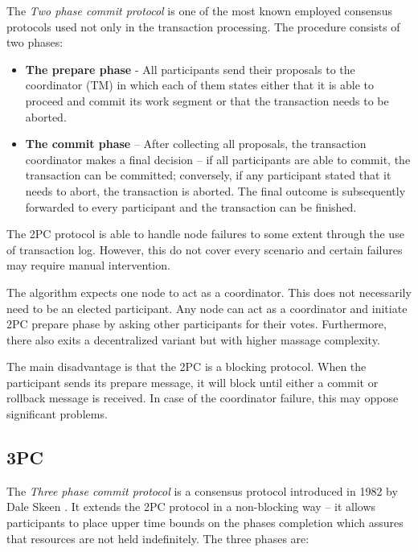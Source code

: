 \documentclass[oneside,
  digital, %
  table,   %
  nolof,     %
  nolot,     %
]{fithesis3}
\begin{document}
The \textit{Two phase commit protocol} is one of the most known employed consensus protocols used not only in the transaction processing. The procedure consists of two phases:

\begin{itemize}
    \item \textbf{The prepare phase} - All participants send their proposals to the coordinator (TM) in which each of them states either that it is able to proceed and commit its work segment or that the transaction needs to be aborted.
    
    \item \textbf{The commit phase} -- After collecting all proposals, the transaction coordinator makes a final decision -- if all participants are able to commit, the transaction can be committed; conversely, if any participant stated that it needs to abort, the transaction is aborted. The final outcome is subsequently forwarded to every participant and the transaction can be finished.
\end{itemize}

The 2PC protocol is able to handle node failures to some extent through the use of transaction log. However, this do not cover every scenario and certain failures may require manual intervention.

The algorithm expects one node to act as a coordinator. This does not necessarily need to be an elected participant. Any node can act as a coordinator and initiate 2PC prepare phase by asking other participants for their votes. Furthermore, there also exits a decentralized variant but with higher massage complexity.

The main disadvantage is that the 2PC is a blocking protocol. When the participant sends its prepare message, it will block until either a commit or rollback message is received. In case of the coordinator failure, this may oppose significant problems.

\subsection{3PC}

The \textit{Three phase commit protocol} is a consensus protocol introduced in 1982 by Dale Skeen \cite{3PC}. It extends the 2PC protocol in a non-blocking way -- it allows participants to place upper time bounds on the phases completion which assures that resources are not  held indefinitely. The three phases are:
\end{document}
